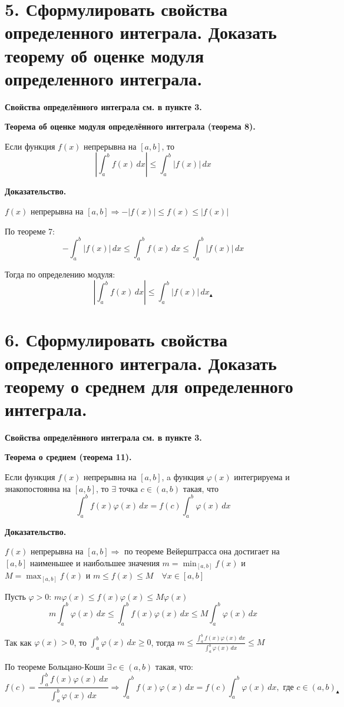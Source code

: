 \documentclass[11pt]{article}
\begin{document}
\section*{5. Сформулировать свойства определенного интеграла. Доказать теорему об оценке модуля определенного интеграла.}
\par\textbf{Свойства определённого интеграла см. в пункте 3.}
\par\textbf{Теорема об оценке модуля определённого интеграла (теорема 8).}
\par Если функция $f(x)$ непрерывна на $[a, b]$, то $$\left| \int_{a}^b f(x) \, dx \right| \leq \int_{a}^b |f(x)| \, dx$$
\par\textbf{Доказательство.}
\par $f(x)$ непрерывна на $[a, b] \Rightarrow -|f(x)| \leq f(x) \leq |f(x)|$
\par По теореме 7: $$- \int_{a}^b |f(x)| \, dx \leq \int_{a}^b f(x) \, dx \leq \int_{a}^b |f(x)| \, dx$$
\par Тогда по определению модуля: $$\left| \int_{a}^b f(x) \, dx \right| \leq \int_{a}^b |f(x)| \, dx _{\blacktriangle}$$

\section*{6. Сформулировать свойства определенного интеграла. Доказать теорему о среднем для определенного интеграла.}
\par\textbf{Свойства определённого интеграла см. в пункте 3.}
\par\textbf{Теорема о среднем (теорема 11).}
\par Если функция $f(x)$ непрерывна на $[a, b]$, a функция $\varphi(x)$ интегрируема и знакопостоянна на $[a, b]$, то $\exists$ точка $c \in (a, b)$ такая, что $$\int_{a}^b f(x)\varphi(x) \, dx = f(c) \int_{a}^b \varphi(x) \, dx$$
\par\textbf{Доказательство.}
\par $f(x)$ непрерывна на $[a, b] \Rightarrow$ по теореме Вейерштрасса она достигает на  $[a, b]$ наименьшее и наибольшее значения $m = \min_{[a, b]} f(x)$ и $M = \max_{[a, b]} f(x)$ и $m \leq f(x) \leq M \quad \forall x \in [a, b]$
\par Пусть $\varphi > 0$:
$m \varphi(x) \leq f(x) \varphi(x) \leq M \varphi(x)$
$$m \int_{a}^b \varphi(x) \, dx  \leq \int_{a}^b f(x) \varphi(x) \, dx \leq M \int_{a}^b \varphi(x) \, dx$$
\par Так как $\varphi(x) > 0$, то $\int_{a}^b \varphi(x) \, dx \geq 0$, тогда $m \leq  \frac{{\int_{a}^b f(x) \varphi(x) \, dx}}{\int_{a}^b \varphi(x) \, dx} \leq M$
\par По теореме Больцано-Коши $\exists \, c \in (a, b)$ такая, что:
$$f(c) = \frac{{\int_{a}^b f(x) \varphi(x) \, dx}}{\int_{a}^b \varphi(x) \, dx} \Rightarrow \int_{a}^b f(x) \varphi(x) \, dx = f(c) \int_{a}^b \varphi(x) \, dx, \text{ где } c \in (a, b) _{\blacktriangle}$$
\end{document}
